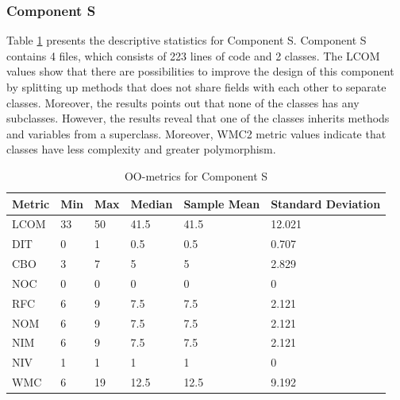\subsubsection{Component S}
Table \ref{tab:oometrics-sys} presents the descriptive statistics for Component S. Component S contains 4 files, which consists of 223 lines of code and 2 classes. The LCOM values show that there are possibilities to improve the design of this component by splitting up methods that does not share fields with each other to separate classes. Moreover, the results points out that none of the classes has any subclasses. However, the results reveal that one of the classes inherits methods and variables from a superclass. Moreover, WMC2 metric values indicate that classes have less complexity and greater polymorphism.

\begin{table}[]
\centering
\caption{OO-metrics for Component S}
\label{tab:oometrics-sys}
\begin{tabular}{|l|l|l|l|l|l|}
\hline
\textbf{Metric} & \textbf{Min} & \textbf{Max} & \textbf{Median} & \textbf{Sample Mean} & \textbf{Standard Deviation} \\ \hline
LCOM            & 33           & 50           & 41.5            & 41.5                 & 12.021                      \\ \hline
DIT             & 0            & 1            & 0.5             & 0.5                  & 0.707                       \\ \hline
CBO             & 3            & 7            & 5             & 5                  & 2.829                       \\ \hline
NOC             & 0            & 0            & 0               & 0                    & 0                           \\ \hline
RFC             & 6            & 9            & 7.5             & 7.5                  & 2.121                       \\ \hline
NOM             & 6            & 9            & 7.5             & 7.5                  & 2.121                       \\ \hline
NIM             & 6            & 9            & 7.5             & 7.5                  & 2.121                       \\ \hline
NIV             & 1            & 1            & 1               & 1                    & 0                           \\ \hline
WMC            & 6           & 19            & 12.5            & 12.5                 & 9.192                         \\ \hline
\end{tabular}
\end{table}

